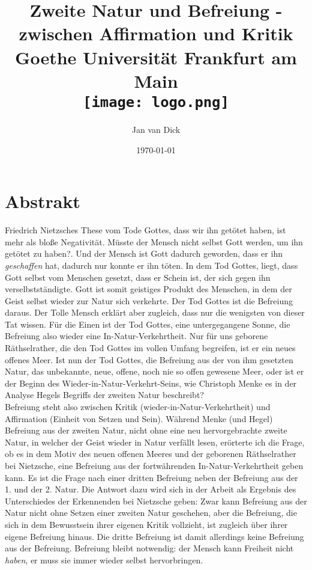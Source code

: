 \documentclass[12pt, a4paper, openany]{report}
\title{
    {Zweite Natur und Befreiung - zwischen Affirmation und Kritik}\\
    {\large Goethe Universität Frankfurt am Main}\\
    {\texttt{[image: logo.png]}}
}
\author{Jan van Dick}
\date{\today}
\newcommand\frontmatter{ \cleardoublepage \pagenumbering{roman}}
\begin{document}
\maketitle
\frontmatter


\chapter*{Abstrakt}
Friedrich Nietzsches These vom Tode Gottes, dass \glqq wir\grqq{} ihn getötet haben, ist mehr als bloße Negativität. 
Müsste der Mensch nicht selbst Gott werden, um ihn getötet zu haben?. 
Und der Mensch ist Gott dadurch geworden, dass er ihn \textit{geschaffen} hat, dadurch nur konnte er ihn töten. 
In dem Tod Gottes, liegt, dass Gott selbst vom Menschen gesetzt, dass er Schein ist, der sich gegen ihn verselbstständigte.
Gott ist somit geistiges Produkt des Menschen, in dem der Geist selbst wieder zur Natur sich verkehrte.
Der Tod Gottes ist die Befreiung daraus.
Der \glqq Tolle Mensch\grqq{} erklärt aber zugleich, dass nur die wenigsten von dieser Tat wissen. 
Für die Einen ist der Tod Gottes, eine untergegangene Sonne, die Befreiung also wieder eine In-Natur-Verkehrtheit.
Nur für uns \glqq geborene Räthselrather\grqq, die den Tod Gottes im vollen Umfang begreifen, ist er ein \glqq neues offenes Meer\grqq{}.
Ist nun der Tod Gottes, die Befreiung aus der von ihm gesetzten Natur, das unbekannte, neue, offene, noch nie so offen gewesene Meer, oder ist er der Beginn des Wieder-in-Natur-Verkehrt-Seins, wie Christoph Menke es in der Analyse Hegels Begriffs der zweiten Natur beschreibt?\\
Befreiung steht also zwischen Kritik (wieder-in-Natur-Verkehrtheit) und Affirmation (Einheit von Setzen und Sein).
Während Menke (und Hegel) Befreiung aus der zweiten Natur, nicht ohne eine neu hervorgebrachte zweite Natur, in welcher der Geist wieder in Natur verfällt lesen, erörterte ich die Frage, ob es in dem Motiv des \glqq neuen offenen Meeres\grqq{} und der \glqq geborenen Räthselrather\grqq{} bei Nietzsche, eine Befreiung aus der fortwährenden In-Natur-Verkehrtheit geben kann.
Es ist die Frage nach einer dritten Befreiung neben der Befreiung aus der 1. und der 2. Natur. 
Die Antwort dazu wird sich in der Arbeit als Ergebnis des Unterschiedes der \glqq Erkennenden\grqq{} bei Nietzsche geben:
Zwar kann Befreiung aus der Natur nicht ohne Setzen einer zweiten Natur geschehen, aber die Befreiung, die sich in dem Bewusstsein ihrer eigenen Kritik vollzieht, ist zugleich über ihrer eigene Befreiung hinaus.
Die dritte Befreiung ist damit allerdings keine Befreiung aus der Befreiung.
Befreiung bleibt notwendig: der Mensch kann Freiheit nicht \textit{haben}, er muss sie immer wieder selbst hervorbringen.
\end{document}
